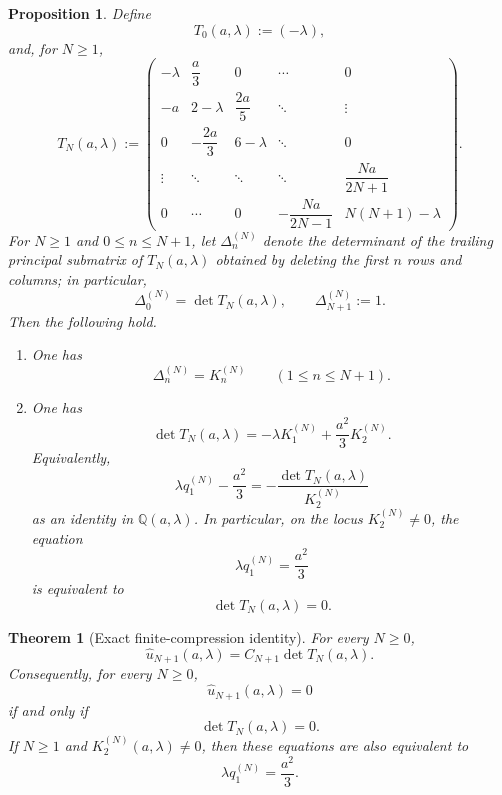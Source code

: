 \documentclass[10pt,a4paper]{amsart}
\newtheorem{proposition}{Proposition}
\newtheorem{theorem}{Theorem}
\newcommand{\Q}{\mathbb{Q}}
\begin{document}
\begin{proposition}\label{prop:truncants-determinants}
Define
\[
T_0(a,\lambda):=(-\lambda),
\]
and, for \(N\ge 1\),
\begin{equation}\label{eq:TN-def}
T_N(a,\lambda):=
\begin{pmatrix}
-\lambda & \dfrac{a}{3} & 0 & \cdots & 0 \\
-a & 2-\lambda & \dfrac{2a}{5} & \ddots & \vdots \\
0 & -\dfrac{2a}{3} & 6-\lambda & \ddots & 0 \\
\vdots & \ddots & \ddots & \ddots & \dfrac{Na}{2N+1} \\
0 & \cdots & 0 & -\dfrac{Na}{2N-1} & N(N+1)-\lambda
\end{pmatrix}.
\end{equation}
For \(N\ge 1\) and \(0\le n\le N+1\), let \(\Delta_n^{(N)}\) denote the determinant of the
trailing principal submatrix of \(T_N(a,\lambda)\) obtained by deleting the first \(n\) rows
and columns; in particular,
\[
\Delta_0^{(N)}=\det T_N(a,\lambda),
\qquad
\Delta_{N+1}^{(N)}:=1.
\]
Then the following hold.
\begin{enumerate}[label=\textup{(\roman*)}]
\item
One has
\[
\Delta_n^{(N)}=K_n^{(N)}
\qquad(1\le n\le N+1).
\]
\item
One has
\begin{equation}\label{eq:detT-K}
\det T_N(a,\lambda)=-\lambda K_1^{(N)}+\frac{a^2}{3}K_2^{(N)}.
\end{equation}
Equivalently,
\begin{equation}\label{eq:truncation-rational-identity}
\lambda q_1^{(N)}-\frac{a^2}{3}
=
-\frac{\det T_N(a,\lambda)}{K_2^{(N)}}
\end{equation}
as an identity in \(\Q(a,\lambda)\). In particular, on the locus \(K_2^{(N)}\neq 0\), the
equation
\begin{equation}\label{eq:truncation-eqn}
\lambda q_1^{(N)}=\frac{a^2}{3}
\end{equation}
is equivalent to
\begin{equation}\label{eq:truncation-det}
\det T_N(a,\lambda)=0.
\end{equation}
\end{enumerate}
\end{proposition}

\begin{theorem}[Exact finite-compression identity]\label{thm:truncation-identity}
For every \(N\ge 0\),
\[
\widehat u_{N+1}(a,\lambda)=C_{N+1}\det T_N(a,\lambda).
\]
Consequently, for every \(N\ge 0\),
\[
\widehat u_{N+1}(a,\lambda)=0
\]
if and only if
\[
\det T_N(a,\lambda)=0.
\]
If \(N\ge 1\) and \(K_2^{(N)}(a,\lambda)\neq 0\), then these equations are also equivalent to
\[
\lambda q_1^{(N)}=\frac{a^2}{3}.
\]
\end{theorem}
\end{document}
